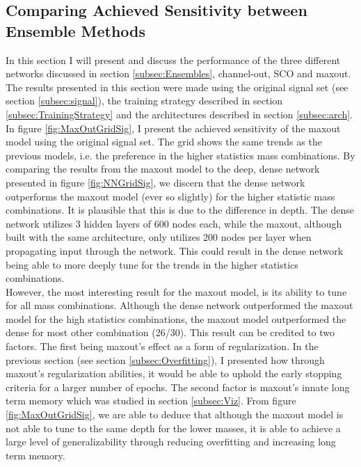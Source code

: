 \subsection{Comparing Achieved Sensitivity between Ensemble Methods}
In this section I will present and discuss the performance of the three different networks discussed in section 
\ref{subsec:Ensembles}, channel-out, \ac{SCO} and maxout. The results presented in this section were made using the
original signal set (see section \ref{subsec:signal}), the training strategy described in section \ref{subsec:TrainingStrategy}
and the architectures described in section \ref{subsec:arch}.
\\
In figure \ref{fig:MaxOutGridSig}, I present the achieved sensitivity of the maxout model using the original signal set. 
The grid shows the same trends as the previous models, i.e. the preference in the higher statistics mass combinations. By comparing 
the results from the maxout model to the deep, dense network presented in figure \ref{fig:NNGridSig}, we discern that the dense 
network outperforms the maxout model (ever so slightly) for the higher statistic mass combinations. It is plausible that this is due 
to the difference in depth. The dense network utilizes 3 hidden layers of 600 nodes each, while the maxout, although built with the 
same architecture, only utilizes 200 nodes per layer when propagating input through the network. This could result in the dense network 
being able to more deeply tune for the trends in the higher statistics combinations.
\\
However, the most interesting result for the maxout model, is its ability to tune for all mass combinations. Although the dense network
outperformed the maxout model for the high statistics combinations, the maxout model outperformed the dense for most other combination (26/30).
This result can be credited to two factors. The first being maxout's effect as a form of regularization. In the previous 
section (see section \ref{subsec:Overfitting}), I presented how through maxout's regularization abilities, it would be able to 
uphold the early stopping criteria for a larger number of epochs. The second factor is maxout's innate long term memory which was studied
in section \ref{subsec:Viz}. From figure \ref{fig:MaxOutGridSig}, we are able to deduce that although the maxout model is not able to tune 
to the same depth for the lower masses, it is able to achieve a large level of generalizability through reducing overfitting and increasing long term memory.\\
